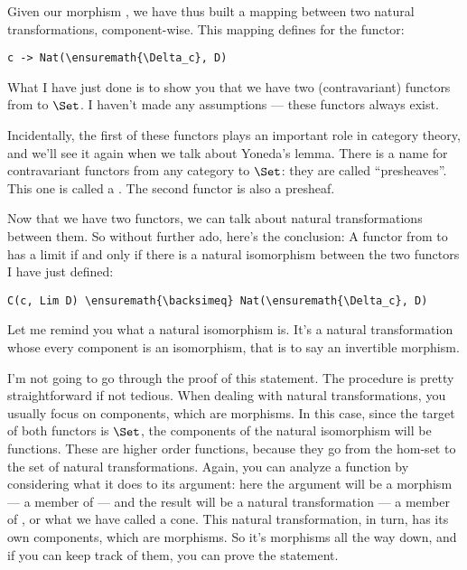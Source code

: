 \begin{figure}[H]
\centering
{}
\end{figure}

\noindent
Given our morphism , we have thus built a mapping between two
natural transformations, component-wise. This mapping defines
 for the functor:

\begin{Verbatim}[commandchars=\\\{\}]
c -> Nat(\ensuremath{\Delta_c}, D)
\end{Verbatim}
What I have just done is to show you that we have two (contravariant)
functors from  to $\Set$. I haven't made any assumptions
--- these functors always exist.

Incidentally, the first of these functors plays an important role in
category theory, and we'll see it again when we talk about Yoneda's
lemma. There is a name for contravariant functors from any category
 to $\Set$: they are called ``presheaves''. This one is
called a . The second functor is also a
presheaf.

Now that we have two functors, we can talk about natural transformations
between them. So without further ado, here's the conclusion: A functor
 from  to  has a limit  if and
only if there is a natural isomorphism between the two functors I have
just defined:

\begin{Verbatim}[commandchars=\\\{\}]
C(c, Lim D) \ensuremath{\backsimeq} Nat(\ensuremath{\Delta_c}, D)
\end{Verbatim}
Let me remind you what a natural isomorphism is. It's a natural
transformation whose every component is an isomorphism, that is to say
an invertible morphism.

I'm not going to go through the proof of this statement. The procedure
is pretty straightforward if not tedious. When dealing with natural
transformations, you usually focus on components, which are morphisms.
In this case, since the target of both functors is $\Set$, the
components of the natural isomorphism will be functions. These are
higher order functions, because they go from the hom-set to the set of
natural transformations. Again, you can analyze a function by
considering what it does to its argument: here the argument will be a
morphism --- a member of  --- and the result will
be a natural transformation --- a member of , or
what we have called a cone. This natural transformation, in turn, has
its own components, which are morphisms. So it's morphisms all the way
down, and if you can keep track of them, you can prove the statement.

